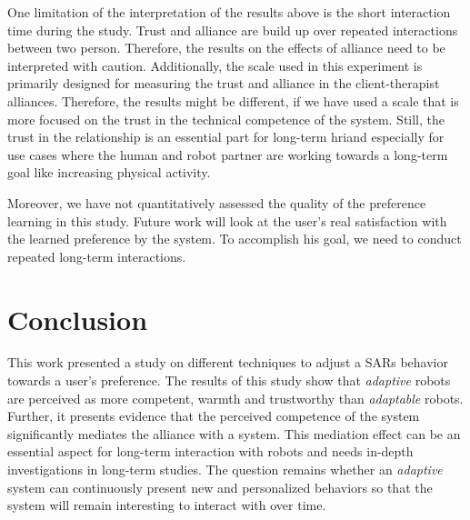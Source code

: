 \documentclass[twocolumn]{svjour3}          %
\begin{document}
One limitation of the interpretation of the results above is the short
interaction time during the study. Trust and alliance are build up over
repeated interactions between two person. Therefore, the results on the
effects of alliance need to be interpreted with caution. Additionally,
the scale used in this experiment is primarily designed for measuring
the trust and alliance in the client-therapist alliances. Therefore,
the results might be different, if we have used a scale that is more
focused on the trust in the technical competence of the system. Still,
the trust in the relationship is an essential part for long-term \gls{hri}and
especially for use cases where the human and robot partner are working
towards a long-term goal like increasing physical activity.

Moreover, we have not quantitatively assessed the quality of the
preference learning in this study. Future work will look at the user's
real satisfaction with the learned preference by the system. To
accomplish his goal, we need to conduct repeated long-term interactions.

\hypertarget{conclusion}{%
\section{\texorpdfstring{Conclusion
\label{adaptation:sec:conclusion}}{Conclusion }}\label{conclusion}}

This work presented a study on different techniques to adjust a SARs
behavior towards a user's preference. The results of this study show
that \textit{adaptive} robots are perceived as more competent, warmth and
trustworthy than \textit{adaptable} robots. Further, it presents evidence that
the perceived competence of the system significantly mediates the
alliance with a system. This mediation effect can be an essential aspect
for long-term interaction with robots and needs in-depth investigations
in long-term studies. The question remains whether an \textit{adaptive} system
can continuously present new and personalized behaviors so that the
system will remain interesting to interact with over time.
\printbibliography{}

% 
% 
\end{document}
